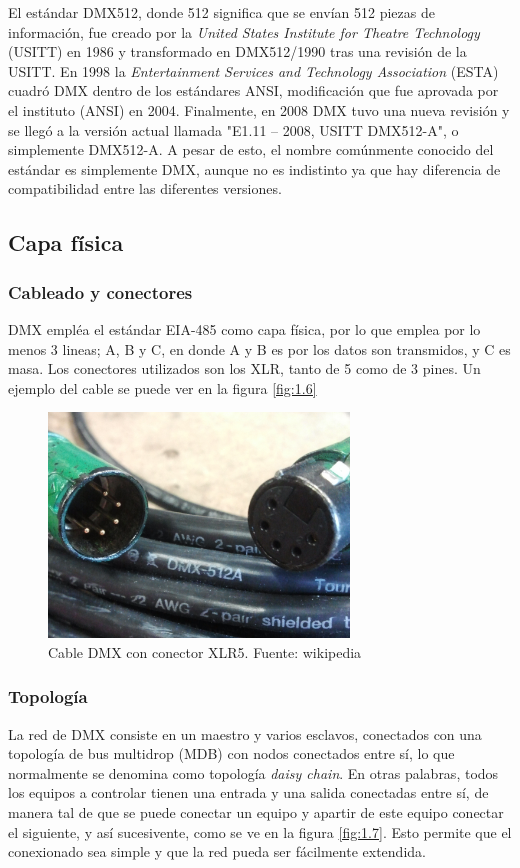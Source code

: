 El estándar DMX512, donde 512 significa que se envían 512 piezas de información, fue creado por la \textit{United States Institute for Theatre Technology} (USITT) en 1986 y transformado en DMX512/1990 tras una revisión de la USITT. En 1998 la \textit{Entertainment Services and Technology Association} (ESTA) cuadró DMX dentro de los estándares ANSI, modificación que fue aprovada por el instituto (ANSI) en 2004. Finalmente, en 2008 DMX tuvo una nueva revisión y se llegó a la versión actual llamada "E1.11 – 2008, USITT DMX512-A", o simplemente DMX512-A. A pesar de esto, el nombre comúnmente conocido del estándar es simplemente DMX, aunque no es indistinto ya que hay diferencia de compatibilidad entre las diferentes versiones.


\subsection{Capa física}
\subsubsection{Cableado y conectores}
DMX empléa el estándar EIA-485 como capa física, por lo que emplea por lo menos 3 lineas; A, B y C, en donde A y B es por los datos son transmidos, y C es masa. Los conectores utilizados son los XLR, tanto de 5 como de 3 pines. Un ejemplo del cable se puede ver en la figura \ref{fig:1.6} \\

\begin{figure}[!ht]
	\centering
	\includegraphics[width=8cm,scale=1]{resources/1_6-cableDMX.jpg}
	\caption{Cable DMX con conector XLR5. Fuente: wikipedia}
	\label{fig:\thefigure}
\end{figure}

\subsubsection{Topología}
La red de DMX consiste en un maestro y varios esclavos, conectados con una topología de bus multidrop (MDB) con nodos conectados entre sí, lo que normalmente se denomina como topología \textit{daisy chain}. En otras palabras, todos los equipos a controlar tienen una entrada y una salida conectadas entre sí, de manera tal de que se puede conectar un equipo y apartir de este equipo conectar el siguiente, y así sucesivente, como se ve en la figura \ref{fig:1.7}. Esto permite que el conexionado sea simple y que la red pueda ser fácilmente extendida.

